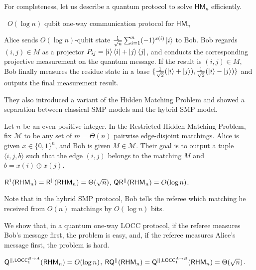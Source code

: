 For completeness, let us describe a quantum protocol to solve $\mathsf{HM}_n$ efficiently.

\begin{algorithm}[H]
\caption{\, $O(\log n)$ qubit one-way communication protocol for $\mathsf{HM}_n$ \cite{BYJK08}}
\label{}
\begin{algorithmic}[1]
\State Alice sends $O(\log n)$-qubit state $\frac{1}{\sqrt{n}} \sum_{i=1}^n (-1)^{x(i)} \ket{i}$ to Bob. 
\State Bob regards $(i,j) \in M$ as a projector $P_{ij} = \ket{i}\bra{i} + \ket{j}\bra{j}$, and conducts the corresponding projective measurement on the quantum message. If the result is $(i,j) \in M$, Bob finally measures the residue state in a base $\{ \frac{1}{\sqrt{2}} (\ket{i}+\ket{j}), \frac{1}{\sqrt{2}}(\ket{i}-\ket{j}) \}$ and outputs the final measurement result.
\end{algorithmic}
\end{algorithm}

They also introduced a variant of the Hidden Matching Problem and showed a separation between classical SMP models and the hybrid SMP model.

\begin{definition}
    Let $n$ be an even positive integer. In the Restricted Hidden Matching Problem, fix $\mathcal{M}$ to be any set of $m = \Theta(n)$ pairwise edge-disjoint matchings. Alice is given $x \in \{0, 1\}^n$, and Bob is given $M \in \mathcal{M}$. Their goal is to output a tuple $\langle i, j, b \rangle$ such that the edge $(i, j)$ belongs to the matching $M$ and $b = x(i) \oplus x(j)$.
\end{definition}

\begin{lemma}\label{lem:rhm}
    $\mathsf{R}^{1}(\mathsf{RHM}_n) = \mathsf{R}^{||}(\mathsf{RHM}_n) = \Theta(\sqrt{n})$, $\mathsf{Q}\mathsf{R}^{||}(\mathsf{RHM}_n) = O(\log n)$.
\end{lemma}

Note that in the hybrid SMP protocol, Bob tells the referee which matching he received from $O(n)$ matchings by $O(\log n)$ bits.

We show that, in a quantum one-way LOCC protocol, if the referee measures Bob's message first, the problem is easy, and, if the referee measures Alice's message first, the problem is hard.

\begin{proposition}
    $\mathsf{Q}^{||,\mathsf{LOCC}_1^{B \rightarrow A}}(\mathsf{RHM}_n) = O(\log n)$, $\mathsf{R}\mathsf{Q}^{||}(\mathsf{RHM}_n) = \mathsf{Q}^{||,\mathsf{LOCC}_1^{A \rightarrow B}}(\mathsf{RHM}_n) = \Theta(\sqrt{n})$.
\end{proposition}

